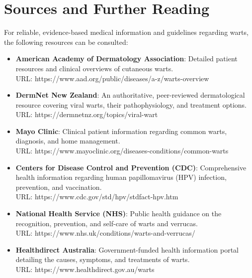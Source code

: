 \section*{Sources and Further Reading}
For reliable, evidence-based medical information and guidelines regarding warts, the following resources can be consulted:
\begin{itemize}
    \item \textbf{American Academy of Dermatology Association}: Detailed patient resources and clinical overviews of cutaneous warts. \\ URL: https://www.aad.org/public/diseases/a-z/warts-overview
    \item \textbf{DermNet New Zealand}: An authoritative, peer-reviewed dermatological resource covering viral warts, their pathophysiology, and treatment options. \\ URL: https://dermnetnz.org/topics/viral-wart
    \item \textbf{Mayo Clinic}: Clinical patient information regarding common warts, diagnosis, and home management. \\ URL: https://www.mayoclinic.org/diseases-conditions/common-warts
    \item \textbf{Centers for Disease Control and Prevention (CDC)}: Comprehensive health information regarding human papillomavirus (HPV) infection, prevention, and vaccination. \\ URL: https://www.cdc.gov/std/hpv/stdfact-hpv.htm
    \item \textbf{National Health Service (NHS)}: Public health guidance on the recognition, prevention, and self-care of warts and verrucas. \\ URL: https://www.nhs.uk/conditions/warts-and-verrucas/
    \item \textbf{Healthdirect Australia}: Government-funded health information portal detailing the causes, symptoms, and treatments of warts. \\ URL: https://www.healthdirect.gov.au/warts
\end{itemize}